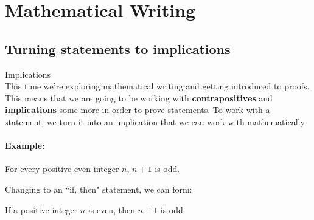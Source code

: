
\newcommand{\laClass}       {CS 210}
\newcommand{\laSemester}    {Spring 2018}
\newcommand{\laChapter}     {2.1}
\newcommand{\laType}        {Exercise}
\newcommand{\laPoints}      {5}
\newcommand{\laTitle}       {Mathematical Writing}
\newcommand{\laDate}        {}
\setcounter{chapter}{2}
\setcounter{section}{1}
\addtocounter{section}{-1}

\toggletrue{answerkey}
\togglefalse{answerkey}






    \section{\laTitle}
    
    \subsection{Turning statements to implications}

        \begin{intro}{Implications} ~\\
            This time we're exploring mathematical writing and getting introduced
            to proofs. This means that we are going to be working with
            \textbf{contrapositives} and \textbf{implications} some more
            in order to prove statements.
            To work with a statement, we turn it into an implication that
            we can work with mathematically.

            \paragraph{Example:}
            For every positive even integer $n$, $n+1$ is odd.

            Changing to an ``if, then" statement, we can form:

            If a positive integer $n$ is even, then $n+1$ is odd.
        \end{intro}

